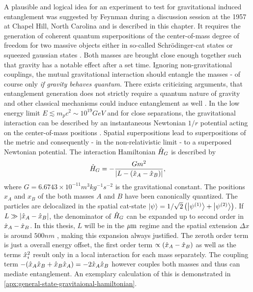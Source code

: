 A plausible and logical idea for an experiment to test for gravitational induced entanglement was suggested by Feynman during a discussion session at the 1957  at Chapel Hill, North Carolina \cite[p. 247-260]{Rickles_2011} and is described in this chapter.
It requires the generation of coherent quantum superpositions of the center-of-mass degree of freedom for two massive objects either in so-called Schrödinger-cat states or squeezed gaussian states \cite{Bose_2017, Pedernales_2023}.
Both masses are brought close enough together such that gravity has a notable effect after a set time.
Ignoring non-gravitational couplings, the mutual gravitational interaction should entangle the masses - of course only \textit{if gravity behaves quantum}.
There exists criticizing arguments, that entanglement generation does not strictly require a quantum nature of gravity and other classical mechanisms could induce entanglement as well \cite{Reginatto_2019}.
In the low energy limit $E\lesssim m_p c^2 \sim 10^{19}\si{GeV}$ and for close separations, the gravitational interaction can be described by an instantaneous Newtonian $1/r$ potential acting on the center-of-mass positions \cite{Carney_2018,Pedernales_2023,Christodoulou_2022}.
Spatial superpositions lead to superpositions of the metric and consequently - in the non-relativistic limit - to a superposed Newtonian potential.
The interaction Hamiltonian $\hat{H}_G$ is described by
\begin{equation}\label{eq:2:gravity-hamiltonian}
  \hat{H}_G = - \frac{Gm^2}{\left\lvert L - (\hat{x}_A - \hat{x}_B)\right\rvert} ,
\end{equation}
where $G=6.6743 \times 10^{-11} \si{m^3 kg^{-1} s^{-2}}$ is the gravitational constant. 
The positions $x_A$ and $x_B$ of the both masses $A$ and $B$ have been canonically quantized. The particles are delocalized in the spatial cat-state $\ket{\psi} = 1/\sqrt{2}\left(\ket{\psi^{(1)}} + \ket{\psi^{(2)}}\right)$.
If $L \gg \left\lvert\hat{x}_A - \hat{x}_B\right\rvert$, the denominator of $\hat{H}_G$ can be expanded up to second order in $\hat{x}_A - \hat{x}_B$. In this thesis, $L$ will be in the $\mathrm{\mu m}$ regime and the spatial extension $\Delta x$ is around $500\si{nm}$ \cite{Fein_2019}, making this expansion always justified.
The zeroth order term is just a overall energy offset, the first order term $\propto (\hat{x}_A - \hat{x}_B)$ as well as the terms $\hat{x}^2_i$ result only in a local interaction for each mass separately. The coupling term $ - (\hat{x}_A\hat{x}_B + \hat{x}_B\hat{x}_A) = -2\hat{x}_A\hat{x}_B$ however couples both masses and thus can mediate entanglement. An exemplary calculation of this is demonstrated in \cref{apx:general-state-gravitaional-hamiltonian}.

